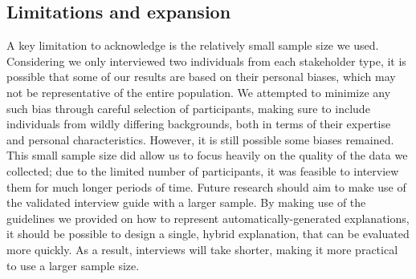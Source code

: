 



\subsection{Limitations and expansion}
A key limitation to acknowledge is the relatively small sample size we used. Considering we only interviewed two individuals from each stakeholder type, it is possible that some of our results are based on their personal biases, which may not be representative of the entire population. We attempted to minimize any such bias through careful selection of participants, making sure to include individuals from wildly differing backgrounds, both in terms of their expertise and personal characteristics. However, it is still possible some biases remained. This small sample size did allow us to focus heavily on the quality of the data we collected; due to the limited number of participants, it was feasible to interview them for much longer periods of time. Future research should aim to make use of the validated interview guide with a larger sample. By making use of the guidelines we provided on how to represent automatically-generated explanations, it should be possible to design a single, hybrid explanation, that can be evaluated more quickly. As a result, interviews will take shorter, making it more practical to use a larger sample size. 


